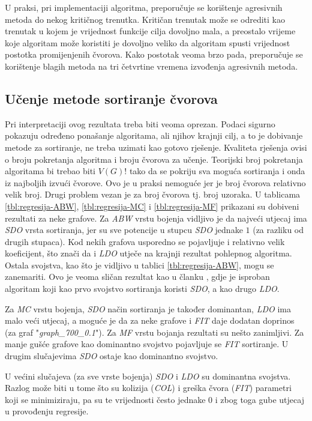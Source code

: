 \documentclass[times, utf8, diplomski, numeric]{fer}
\begin{document}
U praksi, pri implementaciji algoritma, preporučuje se korištenje agresivnih metoda do nekog kritičnog trenutka. Kritičan trenutak može se odrediti kao trenutak u kojem je vrijednost funkcije cilja dovoljno mala, a preostalo vrijeme koje algoritam može koristiti je dovoljno veliko da algoritam spusti vrijednost postotka promijenjenih čvorova. Kako postotak veoma brzo pada, preporučuje se korištenje blagih metoda na tri četvrtine vremena izvođenja agresivnih metoda.

\subsection{Učenje metode sortiranje čvorova}

Pri interpretaciji ovog rezultata treba biti veoma oprezan. Podaci sigurno pokazuju određeno ponašanje algoritama, ali njihov krajnji cilj, a to je dobivanje metode za sortiranje, ne treba uzimati kao gotovo rješenje. Kvaliteta rješenja ovisi o broju pokretanja algoritma i broju čvorova za učenje. Teorijski broj pokretanja algoritama bi trebao biti $V(G)!$ tako da se pokriju sva moguća sortiranja i onda iz najboljih izvući čvorove. Ovo je u praksi nemoguće jer je broj čvorova relativno velik broj. Drugi problem vezan je za broj čvorova tj. broj uzoraka. U tablicama \ref{tbl:regresija-ABW}, \ref{tbl:regresija-MC} i \ref{tbl:regresija-MF} prikazani su dobiveni rezultati za neke grafove. Za \emph{ABW} vrstu bojenja vidljivo je da najveći utjecaj ima \emph{SDO} vrsta sortiranja, jer su sve potencije u stupcu \emph{SDO} jednake $1$ (za razliku od drugih stupaca). Kod nekih grafova usporedno se pojavljuje i relativno velik koeficijent, što znači da i \emph{LDO} utječe na krajnji rezultat pohlepnog algoritma. Ostala svojstva, kao što je vidljivo u tablici \ref{tbl:regresija-ABW}, mogu se zanemariti. Ovo je veoma sličan rezultat kao u članku \cite{lit7}, gdje je isproban algoritam koji kao prvo svojstvo sortiranja koristi \emph{SDO}, a kao drugo \emph{LDO}.

Za \emph{MC} vrstu bojenja, \emph{SDO} način sortiranja je također dominantan, \emph{LDO} ima malo veći utjecaj, a moguće je da za neke grafove i \emph{FIT} daje dodatan doprinos (za graf "\emph{graph\_700\_0.1}"). Za \emph{MF} vrstu bojanja rezultati su nešto zanimljivi. Za manje gušće grafove kao dominantno svojstvo pojavljuje se \emph{FIT} sortiranje. U drugim slučajevima \emph{SDO} ostaje kao dominantno svojstvo.

U većini slučajeva (za sve vrste bojenja) \emph{SDO} i \emph{LDO} su dominantna svojstva. Razlog može biti u tome što su kolizija (\emph{COL}) i greška čvora (\emph{FIT}) parametri koji se minimiziraju, pa su te vrijednosti često jednake $0$ i zbog toga gube utjecaj u provođenju regresije.
\end{document}
